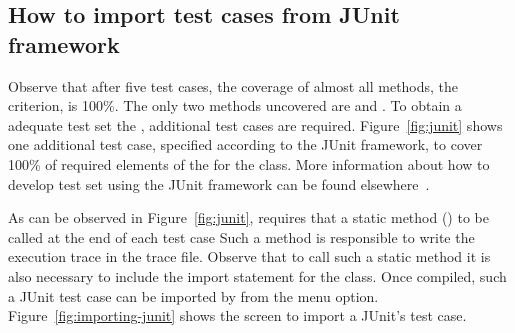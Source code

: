 %
%

\afterpage{\clearpage}
\newpage

\subsection{How to import test cases from JUnit framework}

Observe that after five test cases, the coverage of almost all
methods, \wrt the  criterion, is 100\%. The only
two methods uncovered are  and
. To obtain a adequate test set
\wrt the , additional test cases are required.
Figure~\ref{fig:junit} shows one additional test case, specified
according to the JUnit framework, to cover 100\% of required
elements of the  for the  class.
More information about how to develop test set using the JUnit
framework can be found
elsewhere~\cite{JUnit02UDCA,Rainsberger03JSGU}.



As can be observed in Figure~\ref{fig:junit}, 
\toolname requires that a static method () to be
called at the end of each test case
Such a method is responsible to write
the execution trace in the trace file. Observe that to call such a
static method it is also necessary to include the import statement
for the class. Once compiled, such a JUnit test case can be
imported by \toolname from the  menu option. Figure~\ref{fig:importing-junit} shows
the screen to import a JUnit's test case.

